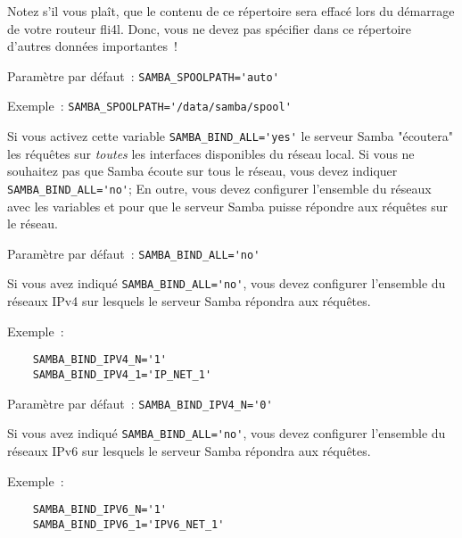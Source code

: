 \begin{description}
    Notez s'il vous plaît, que le contenu de ce répertoire sera effacé lors du démarrage
	de votre routeur fli4l. Donc, vous ne devez pas spécifier dans ce répertoire d'autres
	données importantes~!

    Paramètre par défaut~: \verb+SAMBA_SPOOLPATH='auto'+

    Exemple~: \verb+SAMBA_SPOOLPATH='/data/samba/spool'+



    Si vous activez cette variable \verb+SAMBA_BIND_ALL='yes'+ le serveur
	Samba "écoutera" les réquêtes sur \emph{toutes} les interfaces disponibles du
	réseau local. Si vous ne souhaitez pas que Samba écoute sur tous le réseau, vous
	devez indiquer \verb+SAMBA_BIND_ALL='no'+; En outre, vous devez configurer l'ensemble
	du réseaux avec les variables  et 
	pour que le serveur Samba puisse répondre aux réquêtes sur le réseau.

    Paramètre par défaut~: \verb+SAMBA_BIND_ALL='no'+



    Si vous avez indiqué \verb+SAMBA_BIND_ALL='no'+, vous devez configurer l'ensemble
	du réseaux IPv4 sur lesquels le serveur Samba répondra aux réquêtes.

    Exemple~:
\begin{example}
\begin{verbatim}
    SAMBA_BIND_IPV4_N='1'
    SAMBA_BIND_IPV4_1='IP_NET_1'
\end{verbatim}
\end{example}

    Paramètre par défaut~: \verb+SAMBA_BIND_IPV4_N='0'+



    Si vous avez indiqué \verb+SAMBA_BIND_ALL='no'+, vous devez configurer l'ensemble
	du réseaux IPv6 sur lesquels le serveur Samba répondra aux réquêtes.

    Exemple~:
\begin{example}
\begin{verbatim}
    SAMBA_BIND_IPV6_N='1'
    SAMBA_BIND_IPV6_1='IPV6_NET_1'
\end{verbatim}
\end{example}


\end{description}
